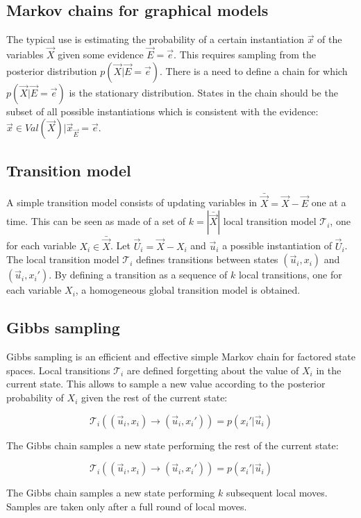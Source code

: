 	\subsection{Markov chains for graphical models}
	The typical use is estimating the probability of a certain instantiation $\vec{x}$ of the variables $\vec{X}$ given some evidence $\vec{E}=\vec{e}$.
  This requires sampling from the posterior distribution $p(\vec{X}|\vec{E}=\vec{e})$.
	There is a need to define a chain for which $p(\vec{X}|\vec{E}=\vec{e})$ is the stationary distribution.
	States in the chain should be the subset of all possible instantiations which is consistent with the evidence: $\vec{x}\in Val(\vec{X})|\vec{x}_{\vec{E}} = \vec{e}$.

	\subsection{Transition model}
	A simple transition model consists of updating variables in $\bar{\vec{X}} = \vec{X}-\vec{E}$ one at a time.
  This can be seen as made of a set of $k=|\bar{\vec{X}}|$ local transition model $\mathcal{T}_i$, one for each variable $X_i\in\bar{\vec{X}}$.
	Let $\vec{U}_i = \vec{X}-X_i$ and $\vec{u}_i$ a possible instantiation of $\vec{U}_i$.
	The local transition model $\mathcal{T}_i$ defines transitions between states $(\vec{u}_i, x_i)$ and $(\vec{u}_i, x_i')$.
	By defining  a transition as a sequence of $k$ local transitions, one for each variable $X_i$, a homogeneous global transition model is obtained.

	\subsection{Gibbs sampling}
	Gibbs sampling is an efficient and effective simple Markov chain for factored state spaces.
	Local transitions $\mathcal{T}_i$ are defined forgetting about the value of $X_i$ in the current state.
	This allows to sample a new value according to the posterior probability of $X_i$ given the rest of the current state:

	$$\mathcal{T}_i((\vec{u}_i, x_i)\rightarrow(\vec{u}_i, x_i')) = p(x_i'|\vec{u}_i)$$

	The Gibbs chain samples a new state performing the rest of the current state:

	$$\mathcal{T}_i((\vec{u}_i, x_i)\rightarrow(\vec{u}_i, x_i')) = p(x_i'|\vec{u}_i)$$

	The Gibbs chain samples a new state performing $k$ subsequent local moves.
	Samples are taken only after a full round of local moves.

